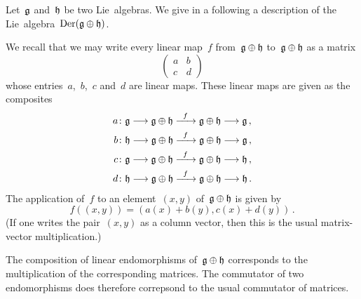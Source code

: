 \begin{example}
  \label{derivations of direct sum}
  Let~$\mathfrak{g}$ and~$\mathfrak{h}$ be two Lie~algebras.
  We give in a following a description of the Lie~algebra~$\operatorname{Der}(\mathfrak{g} \oplus \mathfrak{h})$.

  We recall that we may write every linear map~$f$ from~$\mathfrak{g} \oplus \mathfrak{h}$ to~$\mathfrak{g} \oplus \mathfrak{h}$ as a matrix
  \[
    \begin{pmatrix}
      a & b \\
      c & d
    \end{pmatrix}
  \]
  whose entries~$a$,~$b$,~$c$ and~$d$ are linear maps.
  These linear maps are given as the composites
  \begin{align*}
    a
    &\colon 
    \glie
    \to
    \glie \oplus \hlie
    \xto{f}
    \glie \oplus \hlie
    \to
    \glie \,,
    \\
    b
    &\colon 
    \hlie
    \to
    \glie \oplus \hlie
    \xto{f}
    \glie \oplus \hlie
    \to
    \glie \,,
    \\
    c
    &\colon 
    \glie
    \to
    \glie \oplus \hlie
    \xto{f}
    \glie \oplus \hlie
    \to
    \hlie \,,
    \\
    d
    &\colon 
    \hlie
    \to
    \glie \oplus \hlie
    \xto{f}
    \glie \oplus \hlie
    \to
    \hlie \,.
  \end{align*}
  The application of~$f$ to an element~$(x,y)$ of~$\mathfrak{g} \oplus \mathfrak{h}$ is given by
  \[
    f( (x,y) )
    =
    ( a(x) + b(y), c(x) + d(y) ) \,.
  \]
  (If one writes the pair~$(x,y)$ as a column vector, then this is the usual matrix-vector multiplication.)

  The composition of linear endomorphisms of~$\mathfrak{g} \oplus \mathfrak{h}$ corresponds to the multiplication of the corresponding matrices.
  The commutator of two endomorphisms does therefore correpsond to the usual commutator of matrices.


\end{example}
